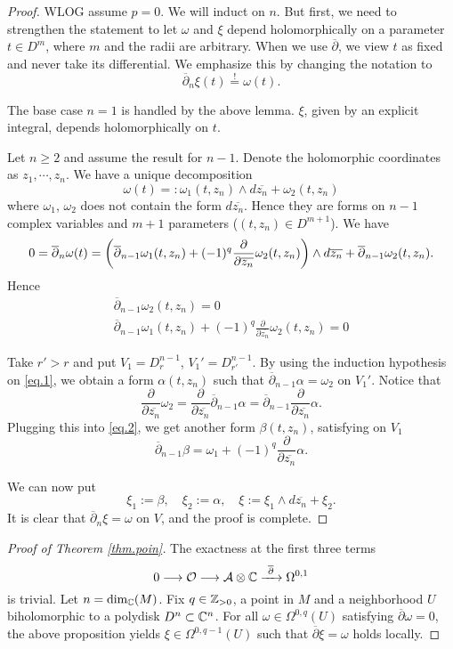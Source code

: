 \documentclass{article}
\newcommand{\dol}{\overline{\partial}}
\begin{document}
\begin{proof}
    WLOG assume $p=0$. We will induct on $n$. But first, we need to strengthen the statement to let $\omega$ and $\xi$ depend holomorphically on a parameter $t\in D^m$, where $m$ and the radii are arbitrary. When we use $\dol$, we view $t$ as fixed and never take its differential. We emphasize this by changing the notation to
    \[
        \dol_n \xi(t) \overset{!}{=} \omega(t).
    \]

    The base case $n=1$ is handled by the above lemma. $\xi$, given by an explicit integral, depends holomorphically on $t$.
    
    Let $n\geq 2$ and assume the result for $n-1$. Denote the holomorphic coordinates as $z_1,\cdots,z_n$. We have a unique decomposition
    \[
        \omega(t) =: \omega_1(t,z_n) \wedge d\overline{z_n} + \omega_2(t,z_n)
    \]
    where $\omega_1$, $\omega_2$ does not contain the form $d\overline{z_n}$. Hence they are forms on $n-1$ complex variables and $m+1$ parameters ($(t,z_n)\in D^{m+1}$). We have
    \[
        0 = \dol_n\omega(t) = \bp{\dol_{n-1}\omega_1(t,z_n)+(-1)^q\frac{\partial}{\partial\overline{z_n}}\omega_2(t,z_n)}\wedge d\overline{z_n} + \dol_{n-1}\omega_2(t,z_n).
    \]
    Hence
    \begin{gather}
        \dol_{n-1}\omega_2(t,z_n) = 0 \label{eq.1}\\
        \dol_{n-1}\omega_1(t,z_n)+(-1)^q\frac{\partial}{\partial\overline{z_n}}\omega_2(t,z_n) = 0 \label{eq.2}
    \end{gather}

    Take $r'>r$ and put $V_{1}=D_{r}^{n-1}$, $V_{1}'=D_{r'}^{n-1}$. By using the induction hypothesis on \eqref{eq.1}, we obtain a form $\alpha(t,z_n)$ such that $\dol_{n-1}\alpha=\omega_2$ on $V_{1}'$. Notice that
    \[
        \frac{\partial}{\partial\overline{z_n}}\omega_2
        = \frac{\partial}{\partial\overline{z_n}}\dol_{n-1}\alpha
        = \dol_{n-1}\frac{\partial}{\partial\overline{z_n}}\alpha.
    \]
    Plugging this into \eqref{eq.2}, we get another form $\beta(t,z_n)$, satisfying on $V_{1}$
    \[
        \dol_{n-1}\beta 
        = \omega_1 + (-1)^q \frac{\partial}{\partial\overline{z_n}}\alpha. 
    \]

    We can now put
    \[
        \xi_1 := \beta,\quad \xi_2 := \alpha,\quad \xi:=\xi_1\wedge d\overline{z_n} + \xi_2.
    \]
    It is clear that $\dol_n\xi=\omega$ on $V$, and the proof is complete.
\end{proof}

\begin{proof}[Proof of Theorem \ref{thm.poin}]
    The exactness at the first three terms
    \[
        0 \longrightarrow \mathcal{O} \longrightarrow \mathcal{A}\otimes\C \xrightarrow{\ \dol\ } \Omega^{0,1}
    \]
    is trivial. Let $n=\dim_{\mathbb{C}}(M)$. Fix $q\in\mathbb{Z}_{>0}$, a point in $M$ and a neighborhood $U$ biholomorphic to a polydisk $D^n\subset\mathbb{C}^n$. For all $\omega\in\Omega^{0,q}(U)$ satisfying $\dol\omega=0$, the above proposition yields $\xi\in\Omega^{0,q-1}(U)$ such that $\dol\xi=\omega$ holds locally.
\end{proof}
\end{document}
